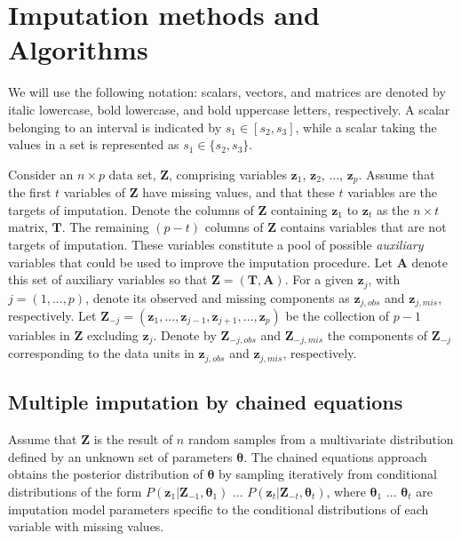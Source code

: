 \section{Imputation methods and Algorithms} \label{secMethods}
We will use the following notation: scalars, vectors, and matrices are denoted by italic lowercase, bold lowercase, and bold uppercase letters, respectively.
A scalar belonging to an interval is indicated by $s_1 \in [s_2, s_3]$, while a scalar taking the values in a set is represented as $s_1 \in \{s_2, s_3\}$.

Consider an $n \times p$ data set, $\bm{Z}$, comprising variables $\bm{z}_1$, $\bm{z}_2$, ..., $\bm{z}_p$.
Assume that the first $t$ variables of $\bm{Z}$ have missing values, and that these $t$ variables are the targets of imputation.
Denote the columns of $\bm{Z}$ containing $\bm{z}_1$ to $\bm{z}_t$ as the $n \times t$ matrix, $\bm{T}$.
The remaining $(p-t)$ columns of $\bm{Z}$ contains variables that are not targets of imputation.
These variables constitute a pool of possible \emph{auxiliary} variables that could be used to improve 
the imputation procedure.
Let $\bm{A}$ denote this set of auxiliary variables so that $\bm{Z} = (\bm{T}, \bm{A})$.
For a given $\bm{z}_j$, with $j = (1, ..., p)$, denote its observed and missing components 
as $\bm{z}_{j, obs}$ and $\bm{z}_{j, mis}$, respectively.
Let $\bm{Z}_{-j} = (\bm{z}_1, ..., \bm{z}_{j-1}, \bm{z}_{j+1}, ..., \bm{z}_{p})$ be the collection of $p-1$ variables in 
$\bm{Z}$ excluding $\bm{z}_j$.
Denote by $\bm{Z}_{-j, obs}$ and $\bm{Z}_{-j, mis}$ the components of $\bm{Z}_{-j}$ corresponding to the
data units in $\bm{z}_{j, obs}$ and $\bm{z}_{j, mis}$, respectively.

\subsection{Multiple imputation by chained equations}

Assume that $\bm{Z}$ is the result of $n$ random samples from a multivariate distribution defined by 
an unknown set of parameters $\bm{\theta}$.
The chained equations approach obtains the posterior distribution of $\bm{\theta}$ by sampling iteratively 
from conditional distributions of the form $P(\bm{z}_{1}|\bm{Z}_{-1}, \bm{\theta}_{1})$ $...$ 
$P(\bm{z}_{t}|\bm{Z}_{-t}, \bm{\theta}_{t})$, where $\bm{\theta}_{1}$ $...$ $\bm{\theta}_{t}$ are imputation model 
parameters specific to the conditional distributions of each variable with missing values.

